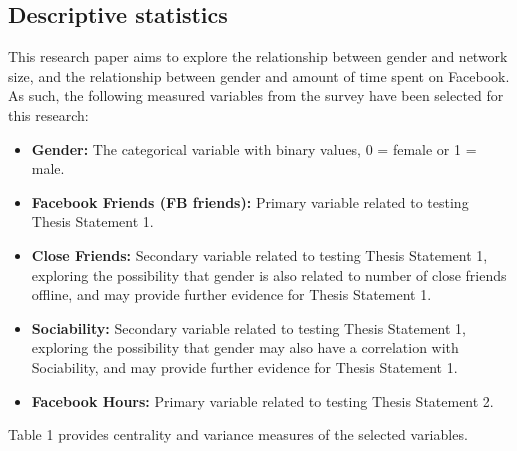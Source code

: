 
\subsection{Descriptive statistics}

This research paper aims to explore the relationship between gender and network size, and the relationship between gender and amount of time spent on Facebook. As such, the following measured variables from the survey have been selected for this research:\\

\begin{itemize}
\item \textbf{Gender:} The categorical variable with binary values, 0 = female or 1 = male.
\item \textbf{Facebook Friends (FB friends):} Primary variable related to testing Thesis Statement 1.
\item \textbf{Close Friends:} Secondary variable related to testing Thesis Statement 1, exploring the possibility that gender is also related to number of close friends offline, and may provide further evidence for Thesis Statement 1.
\item \textbf{Sociability:} Secondary variable related to testing Thesis Statement 1, exploring the possibility that gender may also have a correlation with Sociability, and may provide further evidence for Thesis Statement 1.
\item \textbf{Facebook Hours:} Primary variable related to testing Thesis Statement 2.
\end{itemize}

Table 1 provides centrality and variance measures of the selected variables.\\

